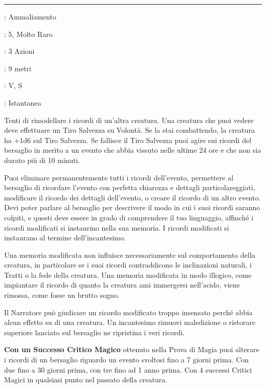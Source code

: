 \begin{multicols}{2}
\smallskip\noindent\rule{\linewidth}{2pt} \hypertarget{Modificare Memoria}{}\medskip{}
\noindent
\begin{description}[noitemsep, topsep=0pt, parsep=0pt, partopsep=0pt, leftmargin=0cm, labelwidth=2.8cm]
	\item[\textbf{Lista di Magia}]: Ammaliamento
	\item[\textbf{Livello}]: 5, Molto Raro
	\item[\textbf{T. di Lancio}]: 3 Azioni
	\item[\textbf{Gittata}]: 9 metri
	\item[\textbf{Componenti}]: V, S
	\item[\textbf{Durata}]: Istantanea
\end{description}

Tenti di rimodellare i ricordi di un'altra creatura. Una creatura che puoi vedere deve effettuare un Tiro Salvezza su Volontà. Se la stai combattendo, la creatura ha +1d6 sul Tiro Salvezza. Se fallisce il Tiro Salvezza puoi agire sui ricordi del bersaglio in merito a un evento che abbia vissuto nelle ultime 24 ore e che non sia durato più di 10 minuti.

Puoi eliminare permanentemente tutti i ricordi dell'evento, permettere al bersaglio di ricordare l'evento con perfetta chiarezza e dettagli particolareggiati, modificare il ricordo dei dettagli dell'evento, o creare il ricordo di un altro evento. Devi poter parlare al bersaglio per descrivere il modo in cui i suoi ricordi saranno colpiti, e questi deve essere in grado di comprendere il tuo linguaggio, affinché i ricordi modificati si instaurino nella sua memoria.
I ricordi modificati si instaurano al termine dell'incantesimo.

Una memoria modificata non influisce necessariamente sul comportamento della creatura, in particolare se i suoi ricordi contraddicono le inclinazioni naturali, i Tratti o la fede della creatura. Una memoria modificata in modo illogico, come impiantare il ricordo di quanto la creatura ami immergersi nell'acido, viene rimossa, come fosse un brutto sogno.

Il Narratore può giudicare un ricordo modificato troppo insensato perché abbia alcun effetto su di una creatura. Un incantesimo rimuovi maledizione o ristorare superiore lanciato sul bersaglio ne ripristina i veri ricordi.

\textbf{Con un Successo Critico Magico} ottenuto nella Prova di Magia puoi alterare i ricordi di un bersaglio riguardo un evento svoltosi fino a 7 giorni prima. Con due fino a 30 giorni prima, con tre fino ad 1 anno prima. Con 4 successi Critici Magici in qualsiasi punto nel passato della creatura.


\end{multicols}
